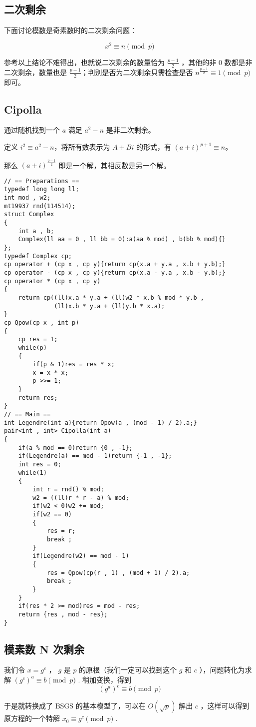 \subsection{二次剩余}

下面讨论模数是奇素数时的二次剩余问题：

$$x^2 \equiv n \pmod p$$

参考以上结论不难得出，也就说二次剩余的数量恰为 $\frac{p-1}{2}$ ，其他的非 $0$ 数都是非二次剩余，数量也是 $\frac{p-1}{2}$；判别是否为二次剩余只需检查是否 $n^{\frac{p-1}{2}} \equiv 1 \pmod p$ 即可。

\subsection{Cipolla}

通过随机找到一个 $a$ 满足 $a^2 - n$ 是非二次剩余。

定义 $i^2\equiv a^2 - n$，将所有数表示为 $A+Bi$ 的形式，有 $(a+i)^{p+1}\equiv n$。

那么 $(a+i)^{\frac{p-1}{2}}$ 即是一个解，其相反数是另一个解。

\begin{verbatim}
// == Preparations ==
typedef long long ll;
int mod , w2;
mt19937 rnd(114514);
struct Complex
{
    int a , b;
    Complex(ll aa = 0 , ll bb = 0):a(aa % mod) , b(bb % mod){}
};
typedef Complex cp;
cp operator + (cp x , cp y){return cp(x.a + y.a , x.b + y.b);}
cp operator - (cp x , cp y){return cp(x.a - y.a , x.b - y.b);}
cp operator * (cp x , cp y)
{
    return cp((ll)x.a * y.a + (ll)w2 * x.b % mod * y.b ,
              (ll)x.b * y.a + (ll)y.b * x.a);
}
cp Qpow(cp x , int p)
{
    cp res = 1;
    while(p)
    {
        if(p & 1)res = res * x;
        x = x * x;
        p >>= 1;
    }
    return res;
}
// == Main ==
int Legendre(int a){return Qpow(a , (mod - 1) / 2).a;}
pair<int , int> Cipolla(int a)
{
    if(a % mod == 0)return {0 , -1};
    if(Legendre(a) == mod - 1)return {-1 , -1};
    int res = 0;
    while(1)
    {
        int r = rnd() % mod;
        w2 = ((ll)r * r - a) % mod;
        if(w2 < 0)w2 += mod;
        if(w2 == 0)
        {
            res = r;
            break ;
        }
        if(Legendre(w2) == mod - 1)
        {
            res = Qpow(cp(r , 1) , (mod + 1) / 2).a;
            break ;
        }
    }
    if(res * 2 >= mod)res = mod - res;
    return {res , mod - res};
}
\end{verbatim}

\subsection{模素数 N 次剩余}

我们令 $x=g^c$ ， $g$ 是 $p$ 的原根（我们一定可以找到这个 $g$ 和 $c$ ），问题转化为求解 $(g^c)^a \equiv b \pmod p$ . 稍加变换，得到
$$ (g^a)^c \equiv b \pmod p $$

于是就转换成了 BSGS 的基本模型了，可以在 $O(\sqrt p)$ 解出 $c$ ，这样可以得到原方程的一个特解 $x_0\equiv g^c\pmod p$ .

